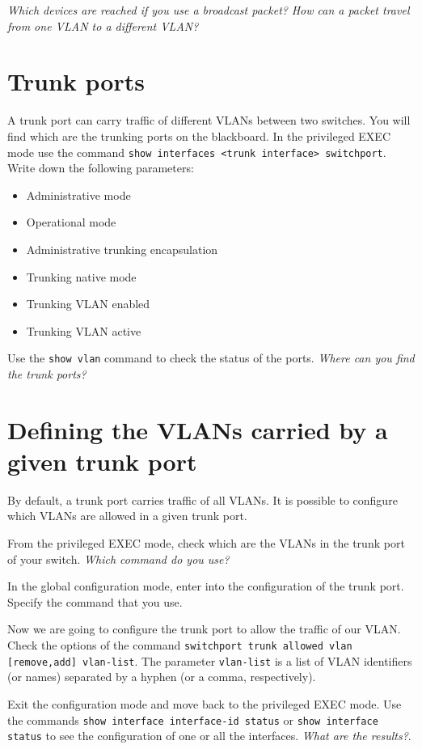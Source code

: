 \emph{Which devices are reached if you use a broadcast packet?}
\emph{How can a packet travel from one VLAN to a different VLAN?}

\section{Trunk ports}

A trunk port can carry traffic of different VLANs between two switches.
You will find which are the trunking ports on the blackboard.
In the privileged EXEC mode use the command \texttt{show interfaces <trunk interface> switchport}.
Write down the following parameters:
\begin{itemize}
\item Administrative mode
\item Operational mode
\item Administrative trunking encapsulation
\item Trunking native mode
\item Trunking VLAN enabled
\item Trunking VLAN active
\end{itemize}

Use the \texttt{show vlan} command to check the status of the ports.
\emph{Where can you find the trunk ports?}

\section{Defining the VLANs carried by a given trunk port}

By default, a trunk port carries traffic of all VLANs.
It is possible to configure which VLANs are allowed in a given trunk port.

From the privileged EXEC mode, check which are the VLANs in the trunk port of your switch.
\emph{Which command do you use?}

In the global configuration mode, enter into the configuration of the trunk port.
Specify the command that you use.

Now we are going to configure the trunk port to allow the traffic of our VLAN.
Check the options of the command \texttt{switchport trunk allowed vlan [remove,add] vlan-list}.
The parameter \texttt{vlan-list} is a list of VLAN identifiers (or names) separated by a  hyphen (or a comma, respectively).

Exit the configuration mode and move back to the privileged EXEC mode.
Use the commands \texttt{show interface interface-id status} or \texttt{show interface status} to see the configuration of one or all the interfaces.
\emph{What are the results?}.

